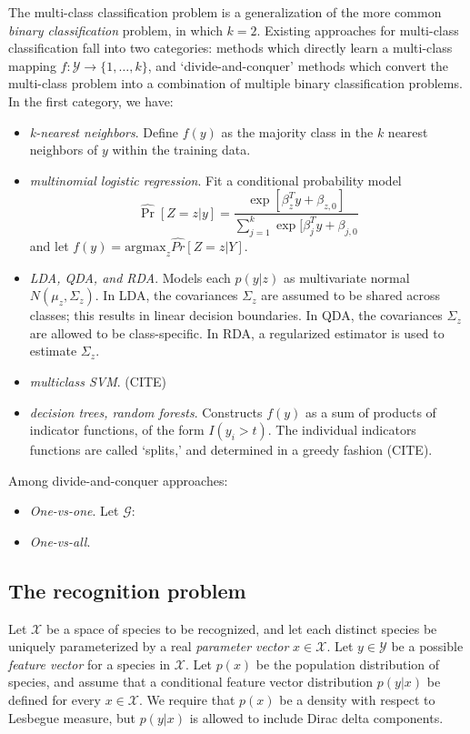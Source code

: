 \documentclass{article}
\newcommand{\argmax}{\text{argmax}}
\begin{document}
The multi-class classification problem is a generalization of the more common \emph{binary classification} problem,
in which $k = 2$.  Existing approaches for multi-class classification fall into two categories:
methods which directly learn a multi-class mapping $f: \mathcal{Y} \to \{1,\hdots, k\}$,
and `divide-and-conquer' methods which convert the multi-class problem into a combination of multiple binary
classification problems.  In the first category, we have:
\begin{itemize}
\item \emph{k-nearest neighbors}.  Define $f(y)$ as the majority class in the $k$ nearest neighbors of $y$ within the training data.
\item \emph{multinomial logistic regression}.  Fit a conditional probability model
\[
\hat{\Pr}[Z = z|y] = \frac{\exp[\beta_z^T y + \beta_{z,0}]}{\sum_{j=1}^k \exp[\beta_j^T y + \beta_{j,0}}
\]
and let $f(y) = \argmax_z \hat{Pr}[Z = z|Y]$.
\item \emph{LDA, QDA, and RDA}.  Models each $p(y|z)$ as multivariate normal $N(\mu_z, \Sigma_z)$.
In LDA, the covariances $\Sigma_z$ are assumed to be shared across classes; this results in linear decision boundaries.
In QDA, the covariances $\Sigma_z$ are allowed to be class-specific.  In RDA, a regularized estimator is used to estimate $\Sigma_z$.
\item \emph{multiclass SVM}.  (CITE)
\item \emph{decision trees, random forests}.  Constructs $f(y)$ as a sum of products of indicator functions, of the form $I(y_i > t)$.
The individual indicators functions are called `splits,' and determined in a greedy fashion (CITE).
\end{itemize}
Among divide-and-conquer approaches:
\begin{itemize}
\item \emph{One-vs-one}.  Let $\mathcal{G}: $
\item \emph{One-vs-all}.
\end{itemize}

\subsection{The recognition problem}

Let $\mathcal{X}$ be a space of species to be recognized, and let each
distinct species be uniquely parameterized by a real \emph{parameter
  vector} $x \in \mathcal{X}$.  Let $y \in \mathcal{Y}$ be a possible
\emph{feature vector} for a species in $\mathcal{X}$.  Let $p(x)$ be
the population distribution of species, and assume that a conditional
feature vector distribution $p(y|x)$ be defined for every $x \in
\mathcal{X}$.  We require that $p(x)$ be a density with respect to
Lesbegue measure, but $p(y|x)$ is allowed to include Dirac delta components.
\end{document}
